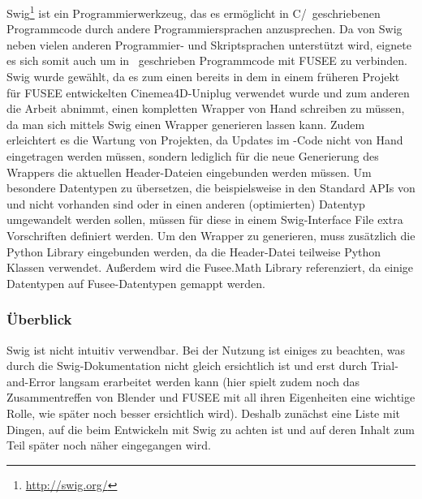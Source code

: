 \label{sec:SWIG}

Swig\footnote{\url{http://swig.org/}} ist ein Programmierwerkzeug, das es ermöglicht in C/\CC~geschriebenen Programmcode durch andere Programmiersprachen anzusprechen. Da \CS von Swig neben vielen anderen Programmier- und Skriptsprachen unterstützt wird, eignete es sich somit auch um in \CC~geschrieben Programmcode mit FUSEE zu verbinden. Swig wurde gewählt, da es zum einen bereits in dem in einem früheren Projekt für FUSEE entwickelten Cinemea4D-Uniplug verwendet wurde und zum anderen die Arbeit abnimmt, einen kompletten Wrapper von Hand schreiben zu müssen, da man sich mittels Swig einen Wrapper generieren lassen kann. Zudem erleichtert es die Wartung von Projekten, da Updates im \CC-Code nicht von Hand eingetragen werden müssen, sondern lediglich für die neue Generierung des Wrappers die aktuellen Header-Dateien eingebunden werden müssen. Um besondere Datentypen zu übersetzen, die beispielsweise in den Standard APIs von \CC und \CS nicht vorhanden sind oder in einen anderen (optimierten) Datentyp umgewandelt werden sollen, müssen für diese in einem Swig-Interface File extra Vorschriften definiert werden.
Um den Wrapper zu generieren, muss zusätzlich die Python Library eingebunden werden, da die Header-Datei teilweise Python Klassen verwendet. Außerdem wird die Fusee.Math Library referenziert, da einige Datentypen auf Fusee-Datentypen gemappt werden.

\subsubsection{Überblick}
Swig ist nicht intuitiv verwendbar. Bei der Nutzung ist einiges zu beachten, was durch die Swig-Dokumentation nicht gleich ersichtlich ist und erst durch Trial-and-Error langsam erarbeitet werden kann (hier spielt zudem noch das Zusammentreffen von Blender und FUSEE mit all ihren Eigenheiten eine wichtige Rolle, wie später noch besser ersichtlich wird). Deshalb zunächst eine Liste mit Dingen, auf die beim Entwickeln mit Swig zu achten ist und auf deren Inhalt zum Teil später noch näher eingegangen wird.


